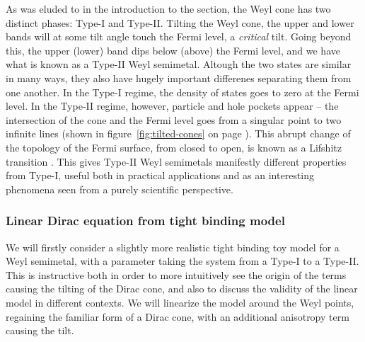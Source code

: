 As was eluded to in the introduction to the section, the Weyl cone has two distinct phases: Type-I and
Type-II.
Tilting the Weyl cone, the upper and lower bands will at some tilt angle touch the Fermi level, a \emph{critical} tilt.
Going beyond this, the upper (lower) band dips below (above) the Fermi level, and we have what is known as a Type-II Weyl semimetal.
Altough the two states are similar in many ways, they also have hugely important differenes separating them from one another.
In the Type-I regime, the density of states goes to zero at the Fermi level.
In the Type-II regime, however, particle and hole pockets appear -- the intersection of the cone and the Fermi level goes from a singular point to two infinite lines (shown in figure~\ref{fig:tilted-cones} on page \pageref{fig:tilted-cones}).
This abrupt change of the topology of the Fermi surface, from closed to open, is known as a Lifshitz transition \cite{volovikTopologicalLifshitzTransitions2017}.
This gives Type-II Weyl semimetals manifestly different properties from Type-I, useful both in practical applications and as an interesting phenomena seen from a purely scientific perspective.


\subsubsection{Linear Dirac equation from tight binding model}
\label{sec:tilt:tightbindingmodel}
We will firstly consider a slightly more realistic tight binding toy model for a Weyl semimetal, with a parameter taking the system from a Type-I to a Type-II.
This is instructive both in order to more intuitively see the origin of the terms causing the tilting of the Dirac cone, and also to discuss the validity of the linear model in different contexts.
We will linearize the model around the Weyl points, regaining the familiar form of a Dirac cone, with an additional anisotropy term causing the tilt.

